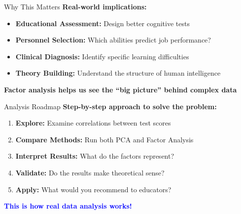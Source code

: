 \documentclass[aspectratio=169]{beamer}
\begin{document}
\begin{frame}{Why This Matters}
  \textbf{Real-world implications:}
  
  \begin{itemize}
    \item \textbf{Educational Assessment:} Design better cognitive tests
    \pause
    \item \textbf{Personnel Selection:} Which abilities predict job performance?
    \pause
    \item \textbf{Clinical Diagnosis:} Identify specific learning difficulties
    \pause
    \item \textbf{Theory Building:} Understand the structure of human intelligence
  \end{itemize}
  
  \pause
  
  \begin{center}
    \textbf{Factor analysis helps us see the ``big picture'' behind complex data}
  \end{center}
\end{frame}

\begin{frame}{Analysis Roadmap}
  \textbf{Step-by-step approach to solve the problem:}
  
  \begin{enumerate}
    \item \textbf{Explore:} Examine correlations between test scores
    \pause
    \item \textbf{Compare Methods:} Run both PCA and Factor Analysis
    \pause
    \item \textbf{Interpret Results:} What do the factors represent?
    \pause
    \item \textbf{Validate:} Do the results make theoretical sense?
    \pause
    \item \textbf{Apply:} What would you recommend to educators?
  \end{enumerate}
  
  \pause
  
  \begin{center}
    \textcolor{blue}{\textbf{This is how real data analysis works!}}
  \end{center}
\end{frame}
\end{document}
